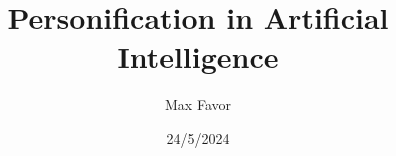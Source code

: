 \documentclass{article}
\title{Personification in Artificial Intelligence}
\author{Max Favor}
\date{24/5/2024}
\begin{document}
\maketitle

\abstract{

}
\tableofcontents













\printbibliography
\end{document}
